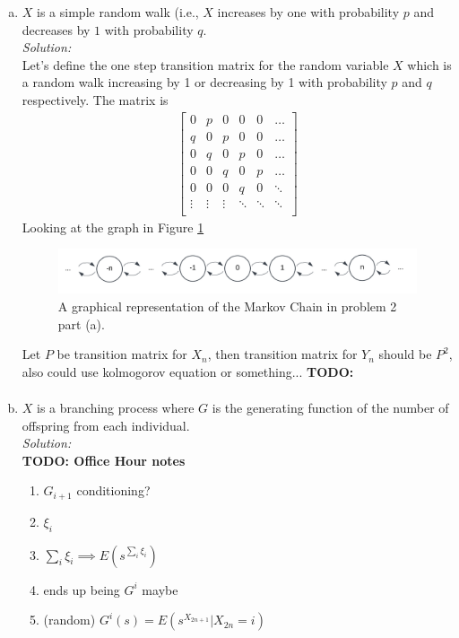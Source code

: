 \documentclass[10pt]{amsart}
\begin{document}
\begin{enumerate}[(a)]
\item $X$ is a simple random walk (i.e., $X$ increases by one with probability $p$ and decreases by $1$ with probability $q$. \\

\noindent
\textit{Solution:} \\
Let's define the one step transition matrix for the random variable $X$ which is a random walk increasing by 1 or decreasing by 1 with probability $p$ and $q$ respectively.
The matrix is
\begin{align*}
\begin{bmatrix}
0 & p & 0 & 0 & 0 & \dots \\
q & 0 & p & 0 & 0 & \dots \\
0 & q & 0 & p & 0 & \dots \\
0 & 0 & q & 0 & p & \dots \\
0 & 0 & 0 & q & 0 & \ddots \\
\vdots & \vdots & \vdots & \ddots & \ddots & \ddots \\
\end{bmatrix}
\end{align*}
Looking at the graph in Figure \ref{fig:f4}
\begin{figure}[h]
	\centering
	\includegraphics[scale=0.5]{two_part_a_markov_graph.png}
	\caption{
		A graphical representation of the Markov Chain in problem 2 part (a).
	}\label{fig:f4}
\end{figure}
Let $P$ be transition matrix for $X_n$, then transition matrix for $Y_n$ should be $P^2$, also could use kolmogorov equation or something...
\textbf{TODO:} \\
\begin{align*}
\end{align*}


\item $X$ is a branching process where $G$ is the generating function of the number of offspring from each individual. \\

\noindent
\textit{Solution:} \\
\textbf{TODO: Office Hour notes} \\
\begin{enumerate}[--]
\item $G_{i + 1}$ conditioning?
\item $\xi_i$
\item $\sum_i \xi_i \implies E(s^{\sum_i \xi_i})$
\item ends up being $G^i$ maybe
\item (random) $G^i(s) = E( s^{X_{2n+ 1}}| X_{2n} = i)$
\end{enumerate}
\begin{align*}
\end{align*}

\end{enumerate}
\end{document}
